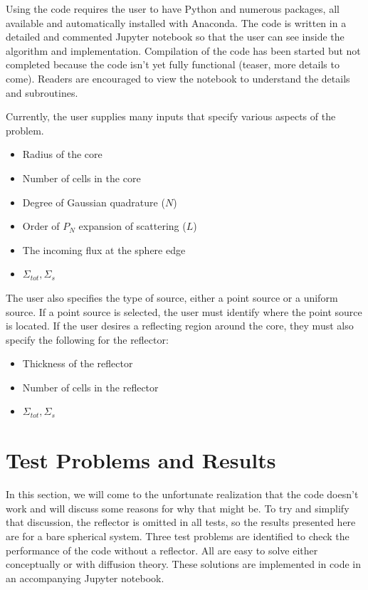 \documentclass[11pt, oneside]{article}   	%
\begin{document}
Using the code requires the user to have Python and numerous packages, all available and automatically installed with Anaconda. The code is written in a detailed and commented Jupyter notebook so that the user can see inside the algorithm and implementation. Compilation of the code has been started but not completed because the code isn't yet fully functional (teaser, more details to come). Readers are encouraged to view the notebook to understand the details and subroutines.

Currently, the user supplies many inputs that specify various aspects of the problem.
%
\begin{itemize}
\item Radius of the core
\item Number of cells in the core
\item Degree of Gaussian quadrature ($N$)
\item Order of $P_N$ expansion of scattering ($L$)
\item The incoming flux at the sphere edge
\item $\Sigma_{tot}, \Sigma_{s}$
\end{itemize}
%
The user also specifies the type of source, either a point source or a uniform source. If a point source is selected, the user must identify where the point source is located. If the user desires a reflecting region around the core, they must also specify the following for the reflector:
%
\begin{itemize}
\item Thickness of the reflector
\item Number of cells in the reflector
\item $\Sigma_{tot}, \Sigma_{s}$
\end{itemize}
%

\section{Test Problems and Results}

In this section, we will come to the unfortunate realization that the code doesn't work and will discuss some reasons for why that might be. To try and simplify that discussion, the reflector is omitted in all tests, so the results presented here are for a bare spherical system. Three test problems are identified to check the performance of the code without a reflector. All are easy to solve either conceptually or with diffusion theory. These solutions are implemented in code in an accompanying Jupyter notebook.
\end{document}
